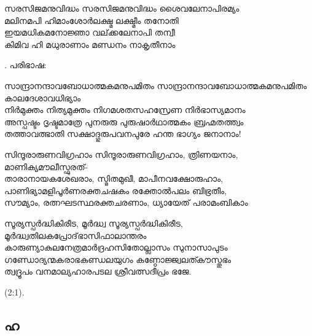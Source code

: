 \begin{enumerate}


\begin{slokam}{\VMl}{\KD}{സരസിജമനുവിദ്ധം}
സരസിജമനുവിദ്ധം ശൈവലേനാപിരമ്യം\\
മലിനമപി ഹിമാംശോര്‍ലക്ഷ്മ ലക്ഷ്മീം തനോതി\\
ഇയമധികമനോജ്ഞാ വല്‌ക്കലേനാപി തന്വീ\\
കിമിവ ഹി മധുരാണാം മണ്ഡനം നാകൃതീനാം
\end{slokam}


. പരിഭാഷ: 

\begin{slokam}{\VSr}{\Melp}{സാന്ദ്രാനന്ദാവബോധാത്മകമനുപമിതം}
സാന്ദ്രാനന്ദാവബോധാത്മകമനുപമിതം കാലദേശാവധിഭ്യാം\\
നിർമുക്തം നിത്യമുക്തം നിഗമശതസഹസ്രേണ നിർഭാസ്യമാനം\\
അസ്പഷ്ടം ദൃഷ്ടമാത്രേ പുനരുരു പുരുഷാർഥാത്മകം ബ്രഹ്മതത്ത്വം\\
തത്താവത്ഭാതി സക്ഷാദ്ഗുരുപവനപുരേ ഹന്ത ഭാഗ്യം ജനാനാം!
\end{slokam}


\begin{slokam}{\VSv}{\Unk}{സിന്ദൂരാരുണവിഗ്രഹാം}
സിന്ദൂരാരുണവിഗ്രഹാം, ത്രിണയനാം, മാണിക്യമൗലീസ്ഫുരത്‌-\\
താരാനായകശേഖരാം, സ്മിതമുഖീ, മാപീനവക്ഷോരുഹാം,\\
പാണിഭ്യാമളിപൂർണരക്തചഷകം രക്തോൽപലം ബിഭ്രതീം,\\
സൗമ്യാം, രത്നഘടസ്ഥരക്തചരണാം, ധ്യായേത്‌ പരാമംബികാം
\end{slokam}



\begin{slokam}{\VSv}{\Melp}{സൂര്യസ്പർദ്ധികിരീട, മൂർദ്ധ്വ}
സൂര്യസ്പർദ്ധികിരീട, മൂർദ്ധ്വതിലകപ്രോദ്‌ഭാസിഫാലാന്തരം\\
കാരുണ്യാകുലനേത്രമാർദ്രഹസിതോല്ലാസം സുനാസാപുടം\\
ഗണ്ഡോദ്യന്മകരാഭകുണ്ഡലയുഗം കണ്ഠോജ്ജ്വലത്കൗസ്തുഭം\\
ത്വദ്രൂ‍പം വനമാല്യഹാരപടല ശ്രീവത്സദീപ്രം ഭജേ.
\end{slokam}


 (2:1).


\end{enumerate}

\subsection{ഹ}

